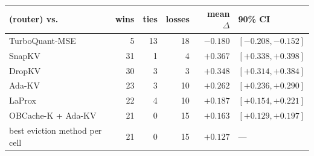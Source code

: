 \begin{tabular}{@{}lrrrrl@{}}
\toprule
\sieve{} (router) vs. & wins & ties & losses & mean $\Delta$ & 90\% CI \\
\midrule
TurboQuant-MSE & 5 & 13 & 18 & $-0.180$ & $[-0.208, -0.152]$ \\
SnapKV & 31 & 1 & 4 & $+0.367$ & $[+0.338, +0.398]$ \\
DropKV & 30 & 3 & 3 & $+0.348$ & $[+0.314, +0.384]$ \\
Ada-KV & 23 & 3 & 10 & $+0.262$ & $[+0.236, +0.290]$ \\
LaProx & 22 & 4 & 10 & $+0.187$ & $[+0.154, +0.221]$ \\
OBCache-K + Ada-KV & 21 & 0 & 15 & $+0.163$ & $[+0.129, +0.197]$ \\
best eviction method per cell & 21 & 0 & 15 & $+0.127$ & --- \\
\bottomrule
\end{tabular}
